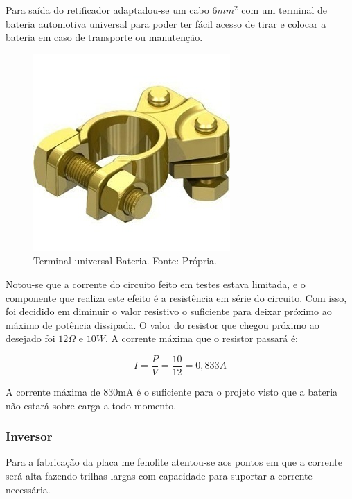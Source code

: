 				Para saída do retificador adaptadou-se um cabo $6mm^2$ com um terminal de 						bateria automotiva universal para poder ter fácil acesso de tirar e 							colocar a bateria em caso de transporte ou manutenção.  
				
                \begin{figure}[!htb]
            		\centering
            		\includegraphics[scale= 0.4]{figuras/Terminal_Bateria.jpg}
            		\caption{Terminal universal Bateria. Fonte: Própria.}
            		\label{terminal}
            	\end{figure}

            	Notou-se que a corrente do circuito feito em testes estava limitada, e o 						componente que realiza este efeito é a resistência em série do circuito. Com 					isso, foi decidido em diminuir o valor resistivo o suficiente para deixar 						próximo ao máximo de potência dissipada. O valor do resistor que chegou 						próximo ao desejado foi $12\Omega$ e $10W$. A corrente máxima que o resistor 					passará é:
            	
          	  	\begin{equation}
                	I = \frac{P}{V} = \frac{10}{12} = 0,833A
            	\end{equation}            	
            	
            	A corrente máxima de 830mA é o suficiente para o projeto visto que a bateria 					não estará sobre carga a todo momento.

             \subsubsection[Inversor]{Inversor}            
				Para a fabricação da placa me fenolite atentou-se aos pontos em que a corrente 				será alta fazendo trilhas largas com capacidade para suportar a corrente 						necessária.

